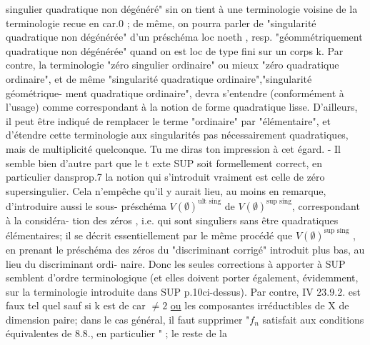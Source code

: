 
singulier quadratique  non dégénéré" sin on tient à une terminologie
voisine de la terminologie  recue en car.0 ; de même, on pourra
parler de "singularité quadratique non dégénérée" d'un préschéma loc
noeth , resp. "géommétriquement  quadratique non dégénérée" quand on est
loc de type fini sur un corps k.  Par contre, la terminologie
"zéro singulier ordinaire" ou mieux "zéro quadratique ordinaire",
et de même "singularité quadratique ordinaire","singularité géométrique-%
ment quadratique ordinaire",  devra s'entendre (conformément à l'usage)
comme correspondant à la notion de forme quadratique lisse. D'ailleurs,
il peut être indiqué de remplacer le terme "ordinaire" par "élémentaire",
et d'étendre cette terminologie aux singularités pas nécessairement
quadratiques, mais de multiplicité quelconque. Tu me diras ton impression
à cet égard.   -    Il semble bien d'autre part que le t exte SUP soit
formellement correct, en particulier dans\hand{/}prop.7  la notion qui s'introduit
vraiment est celle de zéro supersingulier.  Cela n'empêche qu'il y aurait
lieu, au moins en remarque, d'introduire aussi  le sous-%
préschéma  $V(\emptyset)^{\text{ult sing}}$  de $V(\emptyset)^{\text{sup sing}}$, correspondant à la considéra-%
tion des zéros , i.e.  qui sont singuliers sans être
quadratiques élémentaires; il se décrit essentiellement par le même
procédé que $V(\emptyset)^{\text{sup sing}}$  , en prenant le préschéma des zéros du
"discriminant corrigé"  introduit plus bas, au lieu du discriminant ordi-%
naire.  Donc les seules corrections à apporter à SUP semblent d'ordre
terminologique (et elles doivent porter également, évidemment, sur la
terminologie\hand{,}
introduite \hand{$\checkmark$}dans SUP p.10\hand{/}ci-dessus).  Par contre,  IV 23.9.2. est faux tel quel
sauf si k est de car $\neq 2$ \uline{ou} les composantes irréductibles de X  de
dimension paire; dans le cas général, il faut supprimer "$f_n$ satisfait
aux conditions équivalentes de 8.8., en particulier " ; le reste de la

